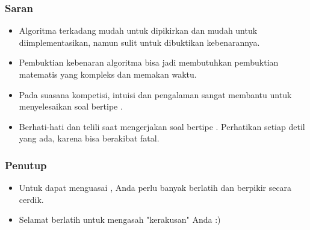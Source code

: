\begin{frame}
\frametitle{Saran}
  \begin{itemize}
    \item Algoritma \fgreedy terkadang mudah untuk dipikirkan dan mudah untuk diimplementasikan, namun sulit untuk dibuktikan kebenarannya.
    \item Pembuktian kebenaran algoritma \fgreedy bisa jadi membutuhkan pembuktian matematis yang kompleks dan memakan waktu.
    \item Pada suasana kompetisi, intuisi dan pengalaman sangat membantu untuk menyelesaikan soal bertipe \fgreedy.
    \item Berhati-hati dan telili saat mengerjakan soal bertipe \fgreedy. Perhatikan setiap detil yang ada, karena  bisa berakibat fatal.
  \end{itemize}
\end{frame}

\begin{frame}
\frametitle{Penutup}
  \begin{itemize}
    \item Untuk dapat menguasai \fgreedy, Anda perlu banyak berlatih dan berpikir secara cerdik.
    \item Selamat berlatih untuk mengasah "kerakusan" Anda :)
  \end{itemize}
\end{frame}


